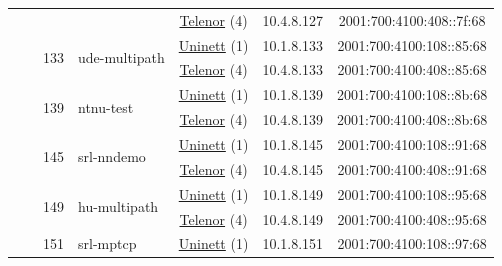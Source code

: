 \begin{small}
\begin{center}
\begin{longtable}{|c|c|c|c|c|c|c|c|}
  &  &  &  & \multicolumn{2}{|c|}{\tiny{\href{https://www.telenor.no}{Telenor} (4)}} & \tiny{10.4.8.127} & \tiny{2001:700:4100:408::7f:68} \\* \cline{3-3}\cline{4-4}\cline{5-5}\cline{6-6}\cline{7-7}\cline{8-8}
  &  & \multirow{2}{*}{\tiny{133}} & \multicolumn{1}{|l|}{\multirow{2}{*}{\tiny{ude-multipath}}} & \multicolumn{2}{|c|}{\tiny{\href{https://www.uninett.no}{Uninett} (1)}} & \tiny{10.1.8.133} & \tiny{2001:700:4100:108::85:68} \\* \cline{5-5}\cline{6-6}\cline{7-7}\cline{8-8}
  &  &  &  & \multicolumn{2}{|c|}{\tiny{\href{https://www.telenor.no}{Telenor} (4)}} & \tiny{10.4.8.133} & \tiny{2001:700:4100:408::85:68} \\* \cline{3-3}\cline{4-4}\cline{5-5}\cline{6-6}\cline{7-7}\cline{8-8}
  &  & \multirow{2}{*}{\tiny{139}} & \multicolumn{1}{|l|}{\multirow{2}{*}{\tiny{ntnu-test}}} & \multicolumn{2}{|c|}{\tiny{\href{https://www.uninett.no}{Uninett} (1)}} & \tiny{10.1.8.139} & \tiny{2001:700:4100:108::8b:68} \\* \cline{5-5}\cline{6-6}\cline{7-7}\cline{8-8}
  &  &  &  & \multicolumn{2}{|c|}{\tiny{\href{https://www.telenor.no}{Telenor} (4)}} & \tiny{10.4.8.139} & \tiny{2001:700:4100:408::8b:68} \\* \cline{3-3}\cline{4-4}\cline{5-5}\cline{6-6}\cline{7-7}\cline{8-8}
  &  & \multirow{2}{*}{\tiny{145}} & \multicolumn{1}{|l|}{\multirow{2}{*}{\tiny{srl-nndemo}}} & \multicolumn{2}{|c|}{\tiny{\href{https://www.uninett.no}{Uninett} (1)}} & \tiny{10.1.8.145} & \tiny{2001:700:4100:108::91:68} \\* \cline{5-5}\cline{6-6}\cline{7-7}\cline{8-8}
  &  &  &  & \multicolumn{2}{|c|}{\tiny{\href{https://www.telenor.no}{Telenor} (4)}} & \tiny{10.4.8.145} & \tiny{2001:700:4100:408::91:68} \\* \cline{3-3}\cline{4-4}\cline{5-5}\cline{6-6}\cline{7-7}\cline{8-8}
  &  & \multirow{2}{*}{\tiny{149}} & \multicolumn{1}{|l|}{\multirow{2}{*}{\tiny{hu-multipath}}} & \multicolumn{2}{|c|}{\tiny{\href{https://www.uninett.no}{Uninett} (1)}} & \tiny{10.1.8.149} & \tiny{2001:700:4100:108::95:68} \\* \cline{5-5}\cline{6-6}\cline{7-7}\cline{8-8}
  &  &  &  & \multicolumn{2}{|c|}{\tiny{\href{https://www.telenor.no}{Telenor} (4)}} & \tiny{10.4.8.149} & \tiny{2001:700:4100:408::95:68} \\* \cline{3-3}\cline{4-4}\cline{5-5}\cline{6-6}\cline{7-7}\cline{8-8}
  &  & \multirow{2}{*}{\tiny{151}} & \multicolumn{1}{|l|}{\multirow{2}{*}{\tiny{srl-mptcp}}} & \multicolumn{2}{|c|}{\tiny{\href{https://www.uninett.no}{Uninett} (1)}} & \tiny{10.1.8.151} & \tiny{2001:700:4100:108::97:68} \\* \cline{5-5}\cline{6-6}\cline{7-7}\cline{8-8}

\end{longtable}
\end{center}
\end{small}
